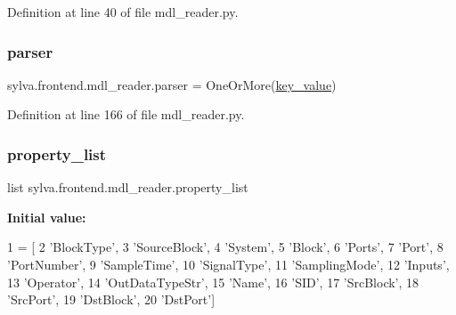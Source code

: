 Definition at line 40 of file mdl\+\_\+reader.\+py.

\mbox{\label{namespacesylva_1_1frontend_1_1mdl__reader_aa76cab99625dd105ca447bfe4fde226d}} 
\subsubsection{\texorpdfstring{parser}{parser}}
{\footnotesize\ttfamily sylva.\+frontend.\+mdl\+\_\+reader.\+parser = One\+Or\+More(\hyperlink{namespacesylva_1_1frontend_1_1mdl__reader_ab486fd03c0920f56c3256072a68fa07e}{key\+\_\+value})}



Definition at line 166 of file mdl\+\_\+reader.\+py.

\mbox{\label{namespacesylva_1_1frontend_1_1mdl__reader_adeb4e351f2cedb282678906b4f6a7178}} 
\subsubsection{\texorpdfstring{property\+\_\+list}{property\_list}}
{\footnotesize\ttfamily list sylva.\+frontend.\+mdl\+\_\+reader.\+property\+\_\+list}

{\bfseries Initial value\+:}
\begin{DoxyCode}
1 =  [
2   \textcolor{stringliteral}{'BlockType'},
3   \textcolor{stringliteral}{'SourceBlock'},
4   \textcolor{stringliteral}{'System'},
5   \textcolor{stringliteral}{'Block'},
6   \textcolor{stringliteral}{'Ports'},
7   \textcolor{stringliteral}{'Port'},
8   \textcolor{stringliteral}{'PortNumber'},
9   \textcolor{stringliteral}{'SampleTime'},
10   \textcolor{stringliteral}{'SignalType'},
11   \textcolor{stringliteral}{'SamplingMode'},
12   \textcolor{stringliteral}{'Inputs'},
13   \textcolor{stringliteral}{'Operator'},
14   \textcolor{stringliteral}{'OutDataTypeStr'},
15   \textcolor{stringliteral}{'Name'},
16   \textcolor{stringliteral}{'SID'},
17   \textcolor{stringliteral}{'SrcBlock'},
18   \textcolor{stringliteral}{'SrcPort'},
19   \textcolor{stringliteral}{'DstBlock'},
20   \textcolor{stringliteral}{'DstPort'}]
\end{DoxyCode}


